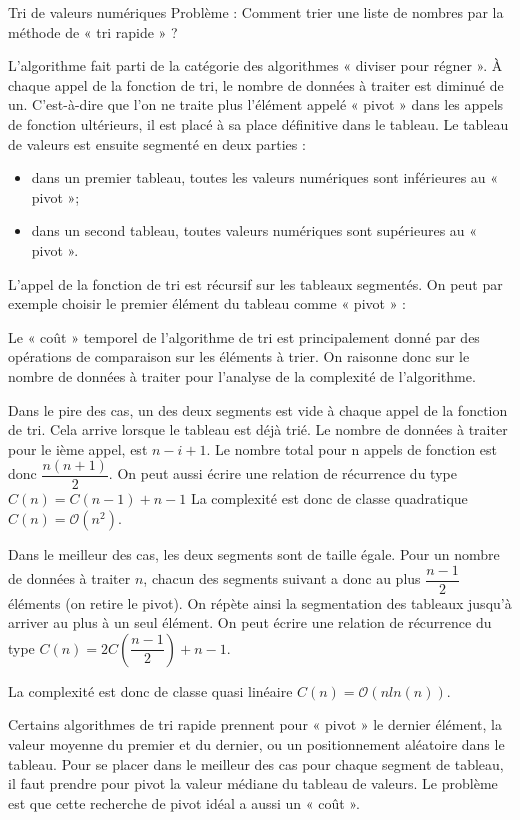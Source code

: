 \documentclass[10pt,fleqn]{article} %
\begin{document}
\begin{exemple}
Tri de valeurs numériques
Problème : Comment trier une liste de nombres par la méthode de « tri rapide » ?
\end{exemple}
L’algorithme fait parti de la catégorie des algorithmes « diviser pour régner ».
À chaque appel de la fonction de tri, le nombre de données à traiter est diminué de un. C'est-à-dire que l’on ne traite plus l’élément appelé « pivot » dans les appels de fonction ultérieurs, il est placé à sa place définitive dans le tableau.
Le tableau de valeurs est ensuite segmenté en deux parties :
\begin{itemize}
\item dans un premier tableau, toutes les valeurs numériques sont inférieures au « pivot »;
\item dans un second tableau, toutes valeurs numériques sont supérieures au « pivot ».
\end{itemize}

L’appel de la fonction de tri est récursif sur les tableaux segmentés.
On peut par exemple choisir le premier élément du tableau comme « pivot » :




Le « coût » temporel de l’algorithme de tri est principalement donné par des opérations de comparaison sur les éléments à trier. On raisonne donc sur le nombre de données à traiter pour l’analyse de la complexité de l’algorithme.

Dans le pire des cas, un des deux segments est vide à chaque appel de la fonction de tri. Cela arrive lorsque le tableau est déjà trié. Le nombre de données à traiter  pour le ième appel, est $n - i + 1$.
Le nombre total pour n appels de fonction est donc $\dfrac{n(n+1)}{2}$. On peut aussi écrire une relation de récurrence du type $C(n) = C(n-1) + n - 1$
La complexité est donc de classe quadratique $C(n) = \mathcal{O}\left(n^2\right)$.

Dans le meilleur des cas, les deux segments sont de taille égale. Pour un nombre de données à traiter $n$, chacun des segments suivant a donc au plus $\dfrac{n-1}{2}$ éléments (on retire le pivot). On répète ainsi la segmentation des tableaux jusqu’à arriver au plus à un seul élément. 
On peut écrire une relation de récurrence du type $C(n) = 2 C\left(\dfrac{n - 1}{ 2} \right)  +  n - 1$.
 
La complexité est donc de classe quasi linéaire $C(n)=\mathcal{O}\left(n ln(n)\right)$.

\begin{rem}
Certains algorithmes de tri rapide prennent pour « pivot » le dernier élément, la valeur moyenne du premier et du dernier, ou un positionnement aléatoire dans le tableau. Pour se placer dans le meilleur des cas pour chaque segment de tableau, il faut prendre pour pivot la valeur médiane du tableau de valeurs. Le problème est que cette recherche de pivot idéal a aussi un « coût ».
\end{rem}
\end{document}
